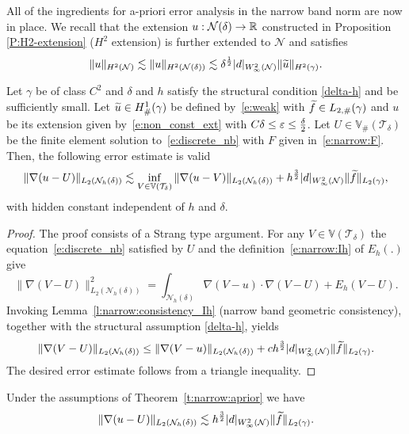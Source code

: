 All of the ingredients for a-priori error analysis in the narrow band norm are now in place. We recall that the extension $u:{\mathcal{N}(\delta)}\to\mathbb{R}$ constructed in Proposition \ref{P:H2-extension} ($H^2$ extension) is further extended to $\mathcal{N}$ and satisfies
%
\begin{equation}\label{extension-N}
\|u\|_{H^2(\mathcal{N})} \lesssim \|u\|_{H^2({\mathcal{N}(\delta)})} \lesssim \delta^{\frac12}
|d|_{W^2_\infty(\mathcal{N})}  \|\widetilde{u}\|_{H^2(\gamma)}.
\end{equation}
%
\begin{theorem}\label{t:narrow:aprior}
Let $\gamma$ be of class $C^2$ and $\delta$ and $h$ satisfy the structural condition
\eqref{delta-h} and be sufficiently small.
Let  $\widetilde{u} \in H^1_\#(\gamma)$ be defined by~\eqref{e:weak} with $\widetilde{f} \in L_{2,\#}(\gamma)$ and $u$ be its extension given by~\eqref{e:non_const_ext} with $C\delta \le \varepsilon \le \frac{\delta}{2}$.
Let $U \in \mathbb V_\#(\mathcal T_\delta)$ be the finite element solution to~\eqref{e:discrete_nb} with $F$ given in~\eqref{e:narrow:F}.
Then, the following error estimate is valid
%
\begin{equation*}\label{e:narrow:best_apprx}
\| \nabla (u - U) \|_{L_2(\mathcal N_h(\delta))} \lesssim
\inf_{V \in \mathbb V(\mathcal T_\delta)} \| \nabla (u - V)\|_{L_2(\mathcal N_h(\delta))} + h^{\frac32} |d|_{W^2_\infty(\mathcal{N})} \| \widetilde{f} \|_{L_2(\gamma)},
\end{equation*}
with hidden constant independent of $h$ and $\delta$.
\end{theorem}
%
\begin{proof}
The proof consists of a Strang type argument.
For any $V \in \mathbb V(\mathcal T_\delta)$ the equation~\eqref{e:discrete_nb} satisfied by $U$ and the definition~\eqref{e:narrow:Ih} of $E_h(.)$ give
$$
\| \nabla (V-U)\|_{L_2(\mathcal N_h(\delta))}^2 = \int_{\mathcal N_h(\delta)} \nabla (V-u) \cdot \nabla (V-U) + E_h(V-U).
$$
Invoking Lemma~\ref{l:narrow:consistency_Ih} (narrow band geometric consistency), together with the structural assumption \eqref{delta-h}, yields
%
$$
\| \nabla (V-U)\|_{L_2(\mathcal N_h(\delta))} \leq \|  \nabla (V-u ) \|_{L_2(\mathcal N_h(\delta))} + c h^{\frac32} |d|_{W^2_\infty(\mathcal{N})} \| \widetilde{f} \|_{L_2(\gamma)}.
$$
%
The desired error estimate follows from a triangle inequality.
\end{proof}
%
\begin{corollary}\label{c:narrow:error} 
Under the assumptions of Theorem~\ref{t:narrow:aprior} we have
$$
\| \nabla (u  - U) \|_{L_2(\mathcal N_h(\delta))} \lesssim h^{\frac32}
|d|_{W^2_\infty(\mathcal{N})}  \| \widetilde{f} \|_{L_2(\gamma)}.
$$
\end{corollary}
